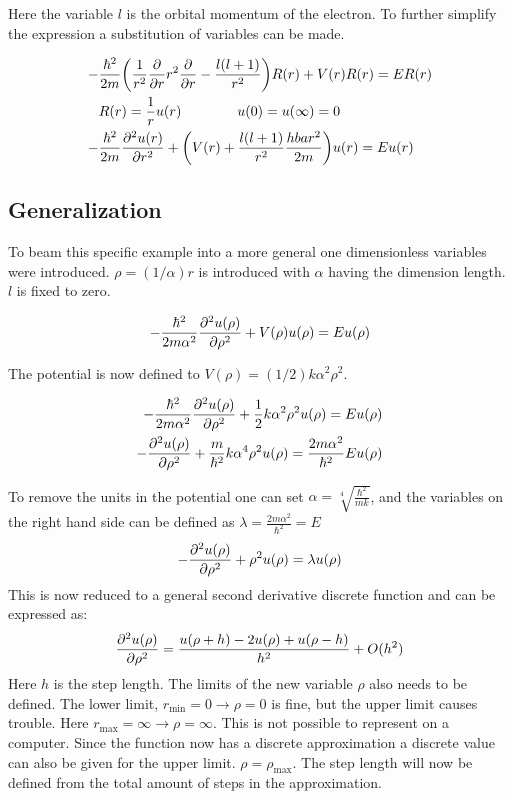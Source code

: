 Here the variable $l$ is the orbital momentum of the electron. To further simplify the expression a substitution of variables can be made.
 
\begin{align*}
	-&\frac{\hbar^2}{2m}\qty(\frac{1}{r^2}\pdv{r}r^2\pdv{r}-\frac{l(l+1)}{r^2})R(r)+V(r)R(r)=ER(r)\\
	&R(r)=\frac{1}{r}u(r)\qquad \qquad u(0)=u(\infty)=0\\
	-&\frac{\hbar^2}{2m}\pdv[2]{u(r)}{r}+\qty(V(r)+\frac{l(l+1)}{r^2}\frac{hbar^2}{2m})u(r)=Eu(r)\\
\end{align*}

\subsection{Generalization}

To beam this specific example into a more general one dimensionless variables were introduced.
$\rho=(1/\alpha)r$ is introduced with $\alpha$ having the dimension length. $l$ is fixed to zero. 

\begin{align*}
	-\frac{\hbar^2}{2m\alpha^2}\pdv[2]{u(\rho)}{\rho}+V(\rho)u(\rho)=Eu(\rho)\\
\end{align*}

The potential is now defined to $V(\rho)=(1/2)k\alpha^2\rho^2$.

\begin{align*}
	-\frac{\hbar^2}{2m\alpha^2}\pdv[2]{u(\rho)}{\rho}+\frac{1}{2}k\alpha^2\rho^2u(\rho)=Eu(\rho)\\
	-\pdv[2]{u(\rho)}{\rho}+\frac{m}{\hbar^2}k\alpha^4\rho^2u(\rho)=\frac{2m\alpha^2}{\hbar^2}Eu(\rho)\\	
\end{align*}

To remove the units in the potential one can set $\alpha=\sqrt[4]{\frac{\hbar^2}{mk}}$, and the variables on the right hand side can be defined as $\lambda=\frac{2m\alpha^2}{\hbar^2}=E$
\begin{align}
	-\pdv[2]{u(\rho)}{\rho}+\rho^2u(\rho)=\lambda u(\rho)\label{general1particle}
\end{align}
This is now reduced to a general second derivative discrete function and can be expressed as:
\begin{align}
	\pdv[2]{u(\rho)}{\rho}=\frac{u(\rho+h)-2u(\rho)+u(\rho-h)}{h^2}+O(h^2)\label{generalwitherror}
\end{align}
Here $h$ is the step length. The limits of the new variable $\rho$ also needs to be defined. The lower limit, $r_{\mathrm{min}}=0\to\rho=0$ is fine, but the upper limit causes trouble. Here  $r_{\mathrm{max}}=\infty\to\rho=\infty$. This is not possible to represent on a computer. Since the function now has a discrete approximation a discrete value can also be given for the upper limit. $\rho=\rho_\mathrm{max}$. The step length will now be defined from the total amount of steps in the approximation.

